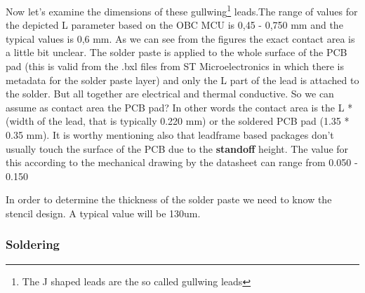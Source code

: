 \documentclass[final]{cubedoc}
\begin{document}



Now let's examine the dimensions of these gullwing\footnote{The J shaped leads are the so called gullwing leads} leads.The range of values for the depicted L parameter based on the OBC MCU is 0,45 - 0,750 mm and the typical values is 0,6 mm. As we can see from the figures the exact contact area is a little bit unclear. The solder paste is applied to the whole surface of the PCB pad (this is valid from the .bxl files from ST Microelectronics in which there is metadata for the solder paste layer) and only the L part of the lead is attached to the solder. But all together are electrical and thermal conductive. So we can assume as contact area the PCB pad? In other words the contact area is the L * (width of the lead, that is typically 0.220 mm) or the soldered PCB pad (1.35 * 0.35 mm). It is worthy mentioning also that leadframe based packages don't usually touch the surface of the PCB due to the \textbf{standoff} height. The value for this according to the mechanical drawing by the datasheet can range from 0.050 - 0.150

In order to determine the thickness of the solder paste we need to know the stencil design. A typical value will be 130um.
\newline


\subsubsection{Soldering}

\end{document}
